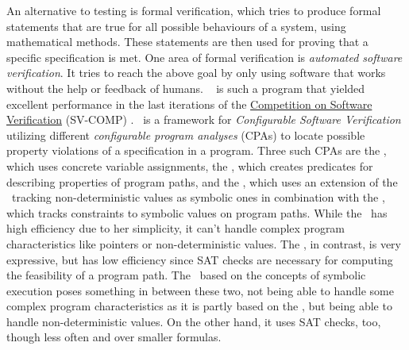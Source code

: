 An alternative to testing is formal verification, which tries to produce formal statements that are true for all possible behaviours of a system, using mathematical methods.
These statements are then used for proving that a specific specification is met.
One area of formal verification is \emph{automated software verification}. It tries to reach the above goal by only using software that works without the help or feedback of humans.
\CpaChecker\ \cite{Beyer2011} is such a program that yielded excellent performance in the last iterations of  the \href{http://sv-comp.sosy-lab.org}{Competition on Software Verification} (SV-COMP) \cite{SV-COMP2013} \cite{SV-COMP2014} \cite{SV-COMP2015}.
\CpaChecker\ is a framework for \emph{Configurable Software Verification} \cite{Beyer2007} utilizing different \emph{configurable program analyses} (CPAs) to locate possible property violations of a specification in a program.
Three such CPAs are the , which uses concrete variable assignments, the \predicateCPA, which creates predicates for describing properties of program paths,
and the \symbolicExecutionCPA, which uses an extension of the \ tracking non-deterministic values as symbolic ones in combination with the \constraintsCPA, which tracks constraints to symbolic values on program paths.
While the \ has high efficiency due to her simplicity, it can't handle complex program characteristics like pointers or non-deterministic values.
The \predicateCPA, in contrast, is very expressive, but has low efficiency since SAT checks are necessary for computing the feasibility of a program path.
The \symbolicExecutionCPA\ based on the concepts of symbolic execution \cite{King1976} poses something in between these two, not being able to handle some complex program characteristics as it is partly based on the , but being able to handle non-deterministic values.
On the other hand, it uses SAT checks, too, though less often and over smaller formulas.

